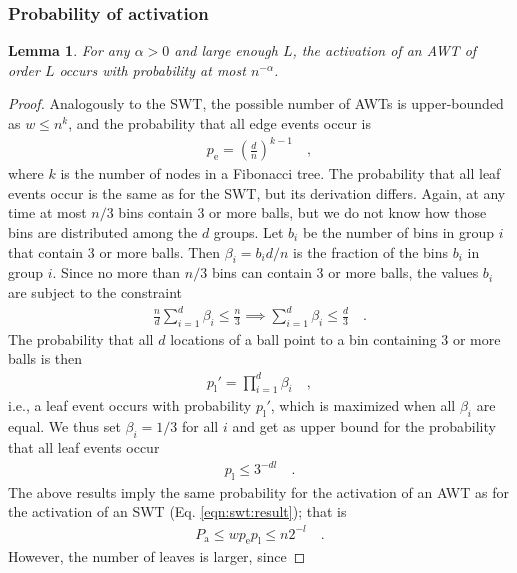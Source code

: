 \documentclass[a4paper,12pt]{article}
\newtheorem{lemma}{Lemma}
\begin{document}
\subsubsection{Probability of activation}
\label{sec:analysis:probabilityAsymWT}
\begin{lemma}\label{lemma:awt:activation}
For any $\alpha>0$ and large enough $L$, the activation of an AWT of order $L$ occurs with probability at most $n^{-\alpha}$.
\end{lemma}

\begin{proof}
Analogously to the SWT, the possible number of AWTs is upper-bounded as $w\leq	n^k$, and the probability that all edge events occur is
\begin{align*}
p_\mathrm{e} = \left(\frac{d}{n}\right)^{k-1}\quad ,
\end{align*}
where $k$ is the number of nodes in a Fibonacci tree. The probability that all leaf events occur is the same as for the SWT, but its derivation differs. Again, at any time at most $n/3$ bins contain 3 or more balls, but we do not know how those bins are distributed among the $d$ groups. Let $b_i$ be the number of bins in group $i$ that contain 3 or more balls. Then $\beta_i = b_i d/ n$ is the fraction of the bins $b_i$ in group $i$. Since no more than $n/3$ bins can contain 3 or more balls, the values $b_i$ are subject to the constraint
\begin{align*}
\frac{n}{d}\sum_{i=1}^d \beta_i \leq \frac{n}{3} \implies
\sum_{i=1}^d \beta_i \leq \frac{d}{3}\quad .
\end{align*}
The probability that all $d$ locations of a ball point to a bin containing 3 or more balls is then 
\begin{align*}
p_\mathrm{l}' = \prod_{i=1}^{d} \beta_i \quad ,
\end{align*}
i.e., a leaf event occurs with probability $p_\mathrm{l}'$, which is maximized when all $\beta_i$ are equal. We thus set $\beta_i = 1/3$ for all $i$ and get as upper bound for the probability that all leaf events occur 
\begin{align*}
p_\mathrm{l} \leq 3^{-d l}\quad .
\end{align*}
The above results imply the same probability for the activation of an AWT as for the activation of an SWT (Eq. \ref{eqn:swt:result}); that is
\begin{align*}
P_\mathrm{a} \leq wp_\mathrm{e}p_\mathrm{l} \leq n  2^{-l}\quad .
\end{align*}
However, the number of leaves is larger, since 

\end{proof}
\end{document}
